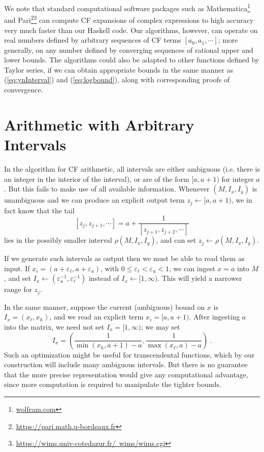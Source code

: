 \documentclass[11pt, oneside]{amsart}   	%
\renewcommand{\:}{\negthickspace:\negthickspace}
\begin{document}
We note that standard computational software packages such as Mathematica\footnote{\href{wolfram.com}{wolfram.com}} and Pari\footnote{\href{https://pari.math.u-bordeaux.fr}{https://pari.math.u-bordeaux.fr}}\footnote{\href{https://wims.univ-cotedazur.fr/~wims/wims.cgi}{https://wims.univ-cotedazur.fr/~wims/wims.cgi}} can compute CF expansions of complex expressions to high accuracy very much faster than our Haskell code.
Our algorithms, however, can operate on real numbers defined by arbitrary sequences of CF terms $[a_0,a_1,\cdots]$; more generally, on any number defined by converging sequences of rational upper and lower bounds.
The algorithms could also be adapted to other functions defined by Taylor series, if we can obtain appropriate bounds in the same manner as (\ref{eq:ynInterval}) and (\ref{eq:logbound}), along with corresponding proofs of convergence.


\section{Arithmetic with Arbitrary Intervals}
In the algorithm for CF arithmetic, all intervals are either ambiguous (i.e. there is an integer in the interior of the interval), or are of the form $[a,a+1)$ for integer $a$. But this fails to make use of all available information.
Whenever $(M,I_x, I_y)$ is unambiguous and we can produce an explicit output term $z_j \leftarrow [a,a+1)$, we in fact know that the tail 
\[
[z_j, z_{j+1},\cdots] = a + \frac{1}{[z_{j+1}, z_{j+2},\cdots]}
\]
lies in the possibly smaller interval $\rho(M,I_x, I_y)$, and can set $z_j \leftarrow \rho(M,I_x, I_y)$.

If we generate such intervals as output then we must be able to read them as input. If $x_i = (a+\varepsilon_\ell, a+\varepsilon_u)$, with $0 \leq \varepsilon_\ell < \varepsilon_u <1$, we can ingest $x=a$ into $M$, and set $I_x \leftarrow (\varepsilon_u^{-1}, \varepsilon_\ell^{-1})$ instead of $I_x \leftarrow [1,\infty)$. This will yield a narrower range for $z_j$.

In the same manner, suppose the current (ambiguous) bound on $x$ is $I_x = (x_{\ell}, x_{h})$, and we read an explicit term $x_i = [a,a+1)$. After ingesting $a$ into the matrix, we need not set $I_x = [1,\infty)$; we may set
\[
I_x = \left(\frac{1}{\min(x_h,a+1) - a}, \frac{1}{\max(x_{\ell},a) - a}\right) \ .
\]
Such an optimization might be useful for transcendental functions, which by our construction will include many ambiguous intervals. But there is no guarantee that the more precise representation would give any computational advantage, since more computation is required to manipulate the tighter bounds.
\end{document}
